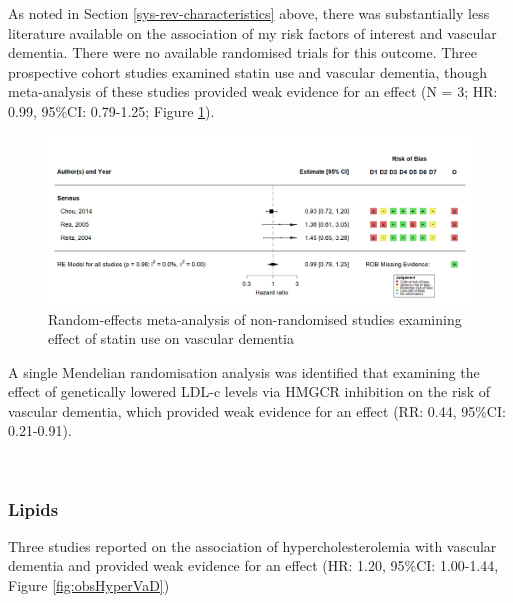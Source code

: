 \documentclass[a4paper, twoside]{templates/ociamthesis}
\begin{document}
As noted in Section \ref{sys-rev-characteristics} above, there was substantially less literature available on the association of my risk factors of interest and vascular dementia. There were no available randomised trials for this outcome. Three prospective cohort studies examined statin use and vascular dementia, though meta-analysis of these studies provided weak evidence for an effect (N = 3; HR: 0.99, 95\%CI: 0.79-1.25; Figure \ref{fig:obsStatinVaDFig}).





\begin{figure}[H]
\includegraphics[width=1\linewidth]{figures/sys-rev/fp_obs_Statin-Ever_VaD} \caption[(ref:obsStatinDVaD-scap)]{Random-effects meta-analysis of non-randomised studies examining effect of statin use on vascular dementia}\label{fig:obsStatinVaDFig}
\end{figure}

A single Mendelian randomisation analysis was identified that examining the effect of genetically lowered LDL-c levels via HMGCR inhibition on the risk of vascular dementia, which provided weak evidence for an effect (RR: 0.44, 95\%CI: 0.21-0.91).

~

\hypertarget{lipids-2}{%
\subsubsection{Lipids}\label{lipids-2}}

Three studies reported on the association of hypercholesterolemia with vascular dementia and provided weak evidence for an effect (HR: 1.20, 95\%CI: 1.00-1.44, Figure \ref{fig:obsHyperVaD})
\end{document}

